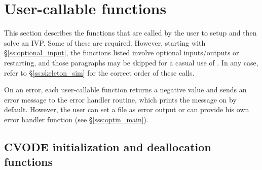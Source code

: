 


\section{User-callable functions}\label{ss:callable_fct_sim}

This section describes the {\cvode} functions that are called by the
user to setup and then solve an IVP. Some of these are required. However,
starting with \S\ref{ss:optional_input}, the functions listed involve
optional inputs/outputs or restarting, and those paragraphs may be
skipped for a casual use of {\cvode}. In any case, refer to
\S\ref{ss:skeleton_sim} for the correct order of these calls.

On an error, each user-callable function returns a negative value and
sends an error message to the error handler routine, which prints the
message on  by default. However, the user can set a file
as error output or can provide his own error handler function (see
\S\ref{sss:optin_main}).

\subsection{CVODE initialization and deallocation functions}
\label{sss:cvodemalloc}

